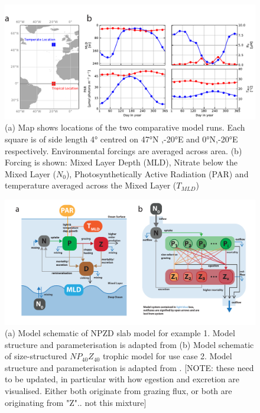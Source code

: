 \documentclass[template.tex]{subfiles}
\begin{document}
\clearpage

\begin{figure}[t]
\includegraphics[width=15cm]{Figures/firstdraft_plots/01_forcing_labeled.pdf}
\caption{(a) Map shows locations of the two comparative model runs. Each square is of side length 4° centred on 47°N ,-20°E and 0°N,-20°E respectively. Environmental forcings are averaged across area. (b) Forcing is shown: Mixed Layer Depth (MLD), Nitrate below the Mixed Layer ($N_0$), Photosynthetically Active Radiation (PAR) and temperature averaged across the Mixed Layer ($T_{MLD}$)}
\label{Figure:phydraforcing}
\end{figure}

\begin{figure}[t]
\includegraphics[width=15cm]{Figures/firstdraft_schematics/02__schematics_NPZDandChemostat.pdf}
\caption{(a) Model schematic of NPZD slab model for example 1. Model structure and parameterisation is adapted
from \citet{Anderson2015c} (b) Model schematic of size-structured $NP_{40}Z_{40}$ trophic model for use case 2. Model structure and parameterisation is adapted from \citet{Banas2011b}. [NOTE: these need to be updated, in particular with how egestion and excretion are visualised. Either both originate from grazing flux, or both are originating from "Z".. not this mixture]}
\label{Figure:phydraschematics_1}
\end{figure}
\end{document}
